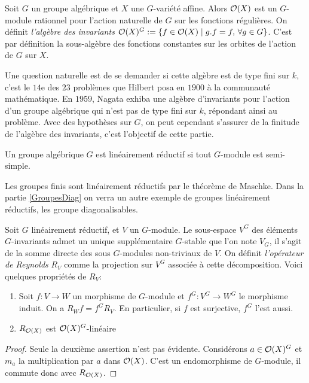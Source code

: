 Soit $G$ un groupe algébrique et $X$ une $G$-variété affine. Alors $\mathcal{O}(X)$ est un $G$-module rationnel pour l'action naturelle de $G$ sur les fonctions régulières. On définit \textit{l'algèbre des invariants} $\mathcal{O}(X)^G:=\lbrace f\in \mathcal{O}(X)\mid g.f=f,\, \forall g\in G\rbrace$. C'est par définition la sous-algèbre des fonctions constantes sur les orbites de l'action de $G$ sur $X$.

Une question naturelle est de se demander si cette algèbre est de type fini sur $k$, c'est le $14$e des $23$ problèmes que Hilbert posa en $1900$ à la communauté mathématique. En $1959$, Nagata exhiba une algèbre d'invariants pour l'action d'un groupe algébrique qui n'est pas de type fini sur $k$, répondant ainsi au problème. Avec des hypothèses sur $G$, on peut cependant s'assurer de la finitude de l'algèbre des invariants, c'est l'objectif de cette partie.

\begin{defn}
Un groupe algébrique $G$ est linéairement réductif si tout $G$-module est semi-simple.
\end{defn}

\begin{ex}\label{ExGpLinReductive}
Les groupes finis sont linéairement réductifs par le théorème de Maschke. Dans la partie \ref{GroupesDiag} on verra un autre exemple de groupes linéairement réductifs, les groupe diagonalisables.
\end{ex}

Soit $G$ linéairement réductif, et $V$ un $G$-module. Le sous-espace $V^G$ des éléments $G$-invariants admet un unique supplémentaire $G$-stable que l'on note $V_G$, il s'agit de la somme directe des sous $G$-modules non-triviaux de $V$. On définit \textit{l'opérateur de Reynolds} $R_V$ comme la projection sur $V^G$ associée à cette décomposition. Voici quelques propriétés de $R_V$:


\begin{prop}\label{reynolds}
\begin{enumerate}
\item Soit $f:V \rightarrow W$ un morphisme de $G$-module et $f^G:V^G \rightarrow W^G$ le morphisme induit. On a $R_Wf=f^GR_V$. En particulier, si $f$ est surjective, $f^G$ l'est aussi.
\item $R_{\mathcal{O}(X)}$ est $\mathcal{O}(X)^G$-linéaire
\end{enumerate}
\end{prop}
\begin{proof}
Seule la deuxième assertion n'est pas évidente. Considérons $a\in \mathcal{O}(X)^G$ et $m_a$ la multiplication par $a$ dans $\mathcal{O}(X)$. C'est un endomorphisme de $G$-module, il commute donc avec $R_{\mathcal{O}(X)}$. 
\end{proof}


